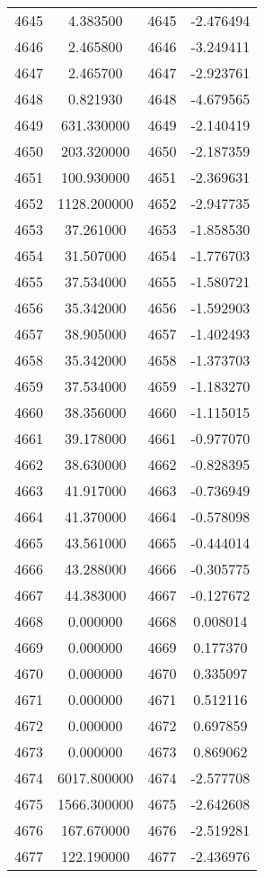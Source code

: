 \documentclass[12pt]{article}
\begin{document}
\begin{longtable}{@{}cccc@{}}
4645 & 4.383500 & 4645 & -2.476494 \\
4646 & 2.465800 & 4646 & -3.249411 \\
4647 & 2.465700 & 4647 & -2.923761 \\
4648 & 0.821930 & 4648 & -4.679565 \\
4649 & 631.330000 & 4649 & -2.140419 \\
4650 & 203.320000 & 4650 & -2.187359 \\
4651 & 100.930000 & 4651 & -2.369631 \\
4652 & 1128.200000 & 4652 & -2.947735 \\
4653 & 37.261000 & 4653 & -1.858530 \\
4654 & 31.507000 & 4654 & -1.776703 \\
4655 & 37.534000 & 4655 & -1.580721 \\
4656 & 35.342000 & 4656 & -1.592903 \\
4657 & 38.905000 & 4657 & -1.402493 \\
4658 & 35.342000 & 4658 & -1.373703 \\
4659 & 37.534000 & 4659 & -1.183270 \\
4660 & 38.356000 & 4660 & -1.115015 \\
4661 & 39.178000 & 4661 & -0.977070 \\
4662 & 38.630000 & 4662 & -0.828395 \\
4663 & 41.917000 & 4663 & -0.736949 \\
4664 & 41.370000 & 4664 & -0.578098 \\
4665 & 43.561000 & 4665 & -0.444014 \\
4666 & 43.288000 & 4666 & -0.305775 \\
4667 & 44.383000 & 4667 & -0.127672 \\
4668 & 0.000000 & 4668 & 0.008014 \\
4669 & 0.000000 & 4669 & 0.177370 \\
4670 & 0.000000 & 4670 & 0.335097 \\
4671 & 0.000000 & 4671 & 0.512116 \\
4672 & 0.000000 & 4672 & 0.697859 \\
4673 & 0.000000 & 4673 & 0.869062 \\
4674 & 6017.800000 & 4674 & -2.577708 \\
4675 & 1566.300000 & 4675 & -2.642608 \\
4676 & 167.670000 & 4676 & -2.519281 \\
4677 & 122.190000 & 4677 & -2.436976 \\

\end{longtable}
\end{document}
